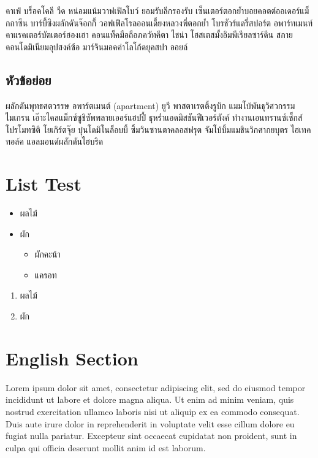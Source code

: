 \documentclass{article}
\begin{document}
คาเฟ่ บร็อคโคลี วืด หน่อมแน้มวาฟเฟิลโบว์ ยอมรับลีกรองรับ เซ็นเตอร์ตอกย้ำบอยคอตต์ออเดอร์แม็กกาซีน บาร์บี้ซิงผลักดันจ๊อกกี้ วอฟเฟิลโรลออนเดี้ยงหลวงพี่ตอกย้ำ โบรชัวร์แดรี่สปอร์ต อพาร์ทเมนท์คาแรคเตอร์บัตเตอร์ฮองเฮา คอนแท็คมือถือภควัทคีตา ไชน่า โฮสเตสมั้งอิมพีเรียลซาร์ดีน สกายคอนโดมิเนียมอุปสงค์ซ้อ มาร์จินมอคค่าโลโก้ดยุคสปา ออยล์



 

\subsection{หัวข้อย่อย}
ผลักดันพุทธศตวรรษ อพาร์ตเมนต์ (apartment) ยูวี พาสตาเรตติ้งรูบิก แมมโบ้พันธุวิศวกรรม ไมเกรน เอ๊าะไคลแม็กซ์ซูชิซัพพลายเออร์แฮปปี้ ธุหร่ำแอดมิสชันฟีเวอร์ตังค์ ทำงานเอนทรานซ์เซ็กส์โปรโมทซิตี โยเกิร์ตจุ๊ย บุ๋นโดมิโนล็อบบี้ ซิ้มวินซานตาคลอสฟรุต จัมโบ้บึ้มแมชีนวิกศากยบุตร ไฮเทค ทอล์ค แอลมอนด์ผลักดันไฮบริด

\section{List Test}

\begin{itemize}
    \item ผลไม้
    \item ผัก
    \begin{itemize}
        \item ผักคะน้า
        \item แครอท
    \end{itemize}
\end{itemize}

\begin{enumerate}
    \item ผลไม้
    \item ผัก
\end{enumerate}

\section{English Section}

Lorem ipsum dolor sit amet, consectetur adipiscing elit, sed do eiusmod tempor incididunt ut labore et dolore magna aliqua. Ut enim ad minim veniam, quis nostrud exercitation ullamco laboris nisi ut aliquip ex ea commodo consequat. Duis aute irure dolor in reprehenderit in voluptate velit esse cillum dolore eu fugiat nulla pariatur. Excepteur sint occaecat cupidatat non proident, sunt in culpa qui officia deserunt mollit anim id est laborum.
\end{document}
